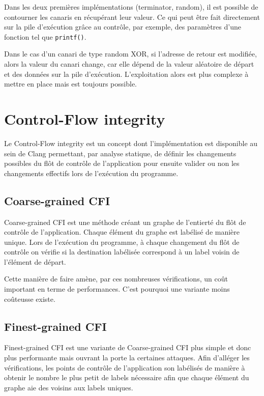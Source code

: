 Dans les deux premières implémentations (terminator, random), il est possible de contourner les canaris en récupérant leur valeur. Ce qui peut être fait directement sur la pile d'exécution grâce au contrôle, par exemple, des paramètres d'une fonction tel que \texttt{printf()}.

Dans le cas d'un canari de type random XOR, si l'adresse de retour est modifiée, alors la valeur du canari change, car elle dépend de la valeur aléatoire de départ et des données sur la pile d'exécution. L'exploitation alors est plus complexe à mettre en place mais est toujours possible.

\section{Control-Flow integrity}

Le \og Control-Flow integrity \fg est un concept dont l'implémentation est disponible au sein de Clang \cite{ControlFlowIntegrity} permettant, par analyse statique, de définir les changements possibles du flôt de contrôle de l'application pour ensuite valider ou non les changements effectifs lors de l'exécution du programme.

\subsection{Coarse-grained CFI}

\og Coarse-grained CFI \fg est une méthode créant un graphe de l'entierté du flôt de contrôle de l'application. Chaque élément du graphe est labélisé de manière unique. Lors de l'exécution du programme, à chaque changement du flôt de contrôle on vérifie si la destination labélisée correspond à un label voisin de l'élément de départ.

Cette manière de faire amène, par ces nombreuses vérifications, un coût important en terme de performances. C'est pourquoi une variante moins coûteusse existe.

\subsection{Finest-grained CFI}

\og Finest-grained CFI \fg est une variante de \og Coarse-grained CFI \fg plus simple et donc plus performante mais ouvrant la porte la certaines attaques. Afin d'alléger les vérifications, les points de contrôle de l'application son labélisés de manière à obtenir le nombre le plus petit de labels nécessaire afin que chaque élément du graphe aie des voisins aux labels uniques.


